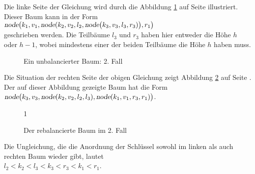 \begin{enumerate}
        Die linke Seite der  Gleichung wird durch die Abbildung \ref{fig:caselr} auf Seite
        \pageref{fig:caselr}
        illustriert.  Dieser Baum kann in der Form \\[0.2cm]
        \hspace*{1.3cm} 
        $\textsl{node}\bigl(k_1,v_1,\textsl{node}(k_2,v_2,l_2,\textsl{node}\bigl(k_3,v_3,l_3,r_3)\bigr),r_1\bigr)$ \\[0.2cm]
        geschrieben werden. Die Teilb\"aume $l_3$ und $r_3$ haben hier entweder die H\"ohe $h$ oder
        $h-1$, wobei mindestens einer der beiden Teilb\"aume die H\"ohe $h$ haben muss.
\begin{figure}[!ht]
  \centering
  \caption{Ein unbalancierter Baum: 2. Fall}
  \label{fig:caselr}
\end{figure}

     Die Situation der rechten Seite der obigen Gleichung zeigt Abbildung
     \ref{fig:caselr-nach} auf Seite \pageref{fig:caselr-nach}.  Der auf dieser
     Abbildung gezeigte Baum hat die Form \\[0.2cm]
     \hspace*{1.3cm} 
     $\textsl{node}\bigl(k_3,v_3,\textsl{node}(k_2,v_2,l_2,l_3),\textsl{node}(k_1,v_1,r_3,r_1) \bigr)$.


\begin{figure}[!ht]
  \centering
  \caption{Der rebalancierte Baum im 2. Fall}
  \label{fig:caselr-nach}1
\end{figure}

      Die Ungleichung, die die Anordnung der Schl\"ussel sowohl im linken als auch rechten
      Baum wieder gibt, lautet\\[0.2cm]
      \hspace*{1.3cm} $l_2 < k_2 < l_3 < k_3 < r_3 < k_1 < r_1$.


\end{enumerate}
